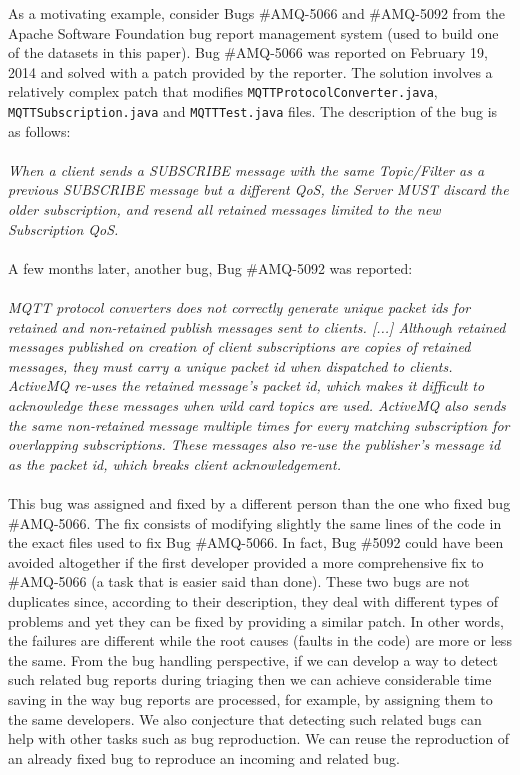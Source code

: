 As a motivating example, consider Bugs \#AMQ-5066 and \#AMQ-5092 from the Apache Software Foundation bug report management system (used to build one of the datasets in this paper).
Bug \#AMQ-5066 was reported on February 19, 2014 and solved with a patch provided by the reporter.
The solution involves a relatively complex patch that modifies {\tt MQTTProtocolConverter.java}, {\tt MQTTSubscription.java} and {\tt MQTTTest.java} files.
The description of the bug is as follows:
\\ \\
{\it When a client sends a SUBSCRIBE message with the same Topic/Filter as a previous SUBSCRIBE message but a different QoS, the Server MUST discard the older subscription, and resend all retained messages limited to the new Subscription QoS.}
\\ \\
A few months later, another bug, Bug \#AMQ-5092 was reported:
\\ \\
{\it MQTT protocol converters does not correctly generate unique packet ids for retained and non-retained publish messages sent to clients.
[...] Although retained messages published on creation of client subscriptions are copies of retained messages, they must carry a unique packet id when dispatched to clients.
ActiveMQ re-uses the retained message's packet id, which makes it difficult to  acknowledge these messages when wild card topics are used.
ActiveMQ also sends the same non-retained message multiple times for every matching subscription for overlapping subscriptions.
These messages also re-use the publisher's message id as the packet id, which breaks client acknowledgement.}
\\ \\
This bug was assigned and fixed by a different person than the one who fixed bug \#AMQ-5066.
The fix consists of modifying slightly the same lines of the code in the exact files used to fix Bug \#AMQ-5066.
In fact, Bug \#5092 could have been avoided altogether if the first developer provided a more comprehensive fix to \#AMQ-5066 (a task that is easier said than done).
These two bugs are not duplicates since, according to their description, they deal with different types of problems and yet they can be fixed by providing a similar patch.
In other words, the failures are different while the root causes (faults in the code) are more or less the same.
From the bug handling perspective, if we can develop a way to detect such related bug reports during triaging then we can achieve considerable time saving in the way bug reports are processed, for example, by assigning them to the same developers.
We also conjecture that detecting such related bugs can help with other tasks such as bug reproduction.
We can  reuse the reproduction of an already fixed bug to reproduce an incoming and related bug.


